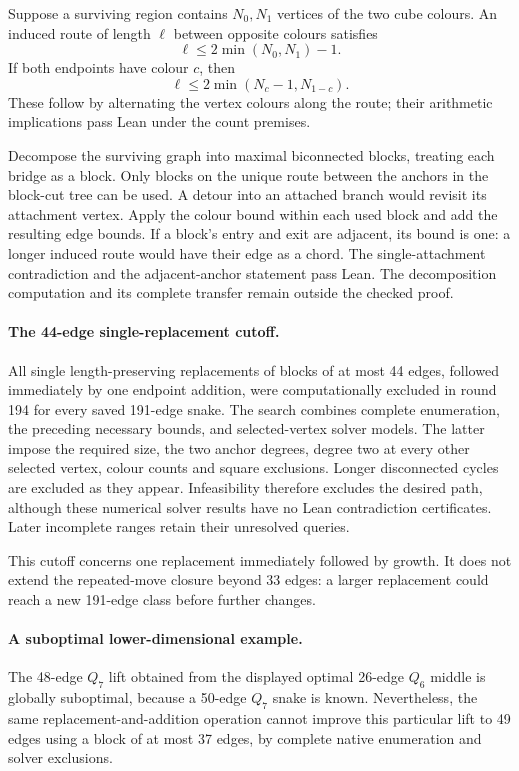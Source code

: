 \documentclass[11pt,a4paper]{article}
\theoremstyle{definition}
\theoremstyle{remark}
\begin{document}
Suppose a surviving region contains $N_0,N_1$ vertices of the two
cube colours. An induced route of length $\ell$ between opposite
colours satisfies
\[
\ell\le2\min(N_0,N_1)-1.
\]
If both endpoints have colour $c$, then
\[
\ell\le2\min(N_c-1,N_{1-c}).
\]
These follow by alternating the vertex colours along the route;
their arithmetic implications pass Lean under the count premises.

Decompose the surviving graph into maximal biconnected blocks,
treating each bridge as a block. Only blocks on the unique route
between the anchors in the block-cut tree can be used. A detour into
an attached branch would revisit its attachment vertex. Apply the
colour bound within each used block and add the resulting edge bounds.
If a block's entry and exit are adjacent, its bound is one: a longer
induced route would have their edge as a chord. The single-attachment
contradiction and the adjacent-anchor statement pass Lean. The
decomposition computation and its complete transfer remain outside
the checked proof.

\paragraph{The 44-edge single-replacement cutoff.}
All single length-preserving replacements of blocks of at most 44
edges, followed immediately by one endpoint addition, were computationally
excluded in round 194 for every saved 191-edge snake. The search
combines complete enumeration, the preceding necessary bounds, and
selected-vertex solver models. The latter impose the required size,
the two anchor degrees, degree two at every other selected vertex,
colour counts and square exclusions. Longer disconnected cycles are
excluded as they appear. Infeasibility therefore excludes the desired
path, although these numerical solver results have no Lean contradiction
certificates. Later incomplete ranges retain their unresolved queries.

This cutoff concerns one replacement immediately followed by growth.
It does not extend the repeated-move closure beyond 33 edges: a larger
replacement could reach a new 191-edge class before further changes.

\paragraph{A suboptimal lower-dimensional example.}
The 48-edge $Q_7$ lift obtained from the displayed optimal 26-edge
$Q_6$ middle is globally suboptimal, because a 50-edge $Q_7$ snake is
known. Nevertheless, the same replacement-and-addition operation
cannot improve this particular lift to 49 edges using a block of
at most 37 edges, by complete native enumeration and solver exclusions.
\end{document}

